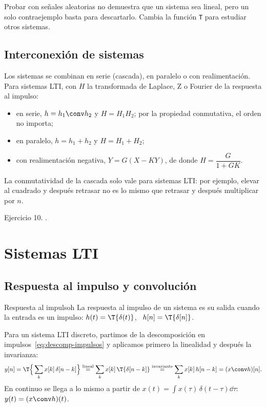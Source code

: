 \documentclass[11pt,a4paper]{scrartcl}
\begin{document}
\begin{encodigo}
  Probar con señales aleatorias no demuestra que un sistema sea lineal, pero un solo contraejemplo basta para descartarlo. Cambia la función \texttt{T} para estudiar otros sistemas.
\end{encodigo}

\subsection{Interconexión de sistemas}

Los sistemas se combinan en serie (cascada), en paralelo o con realimentación. Para sistemas LTI, con $H$ la transformada de Laplace, Z o Fourier de la respuesta al impulso:
\begin{itemize}
  \item en serie, $h=h_1\conv h_2$ y $H=H_1H_2$; por la propiedad conmutativa, el orden no importa;
  \item en paralelo, $h=h_1+h_2$ y $H=H_1+H_2$;
  \item con realimentación negativa, $Y=G(X-KY)$, de donde $H=\dfrac{G}{1+GK}$.
\end{itemize}
La conmutatividad de la cascada solo vale para sistemas LTI: por ejemplo, elevar al cuadrado y después retrasar no es lo mismo que retrasar y después multiplicar por $n$.

\begin{flushright}\small\color{pdsgris}Ejercicio 10. .\end{flushright}

\section{Sistemas LTI}\label{sec:lti}

\subsection{Respuesta al impulso y convolución}

\begin{definicion}{Respuesta al impulso}{h}
  La respuesta al impulso de un sistema es su salida cuando la entrada es un impulso: $h(t)=\T\{\delta(t)\}$, \ $h[n]=\T\{\delta[n]\}$.
\end{definicion}

Para un sistema LTI discreto, partimos de la descomposición en impulsos~\eqref{eq:descomp-impulsos} y aplicamos primero la linealidad y después la invarianza:
\[
  y[n]=\T\Big\{\sum_k x[k]\,\delta[n-k]\Big\}
  \overset{\text{lineal}}{=}\sum_k x[k]\,\T\{\delta[n-k]\}
  \overset{\text{invariante}}{=}\sum_k x[k]\,h[n-k]=(x\conv h)[n].
\]
En continuo se llega a lo mismo a partir de $x(t)=\int x(\tau)\,\delta(t-\tau)\dd\tau$: $y(t)=(x\conv h)(t)$.
\end{document}
